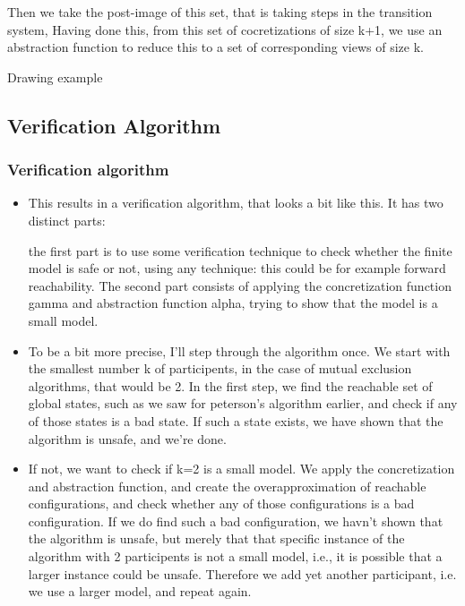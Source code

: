\documentclass[handout]{beamer}
\begin{document}
\begin{footnotesize}
\begin{frame}
\begin{itemize}
Then we take the post-image of this set, that is taking steps in the transition system,
Having done this, from this set of cocretizations of size k+1, we use an abstraction function to reduce this to a set of corresponding views of size k.

\end{itemize}
\end{frame}

\begin{frame}
Drawing example
\end{frame}

\subsection{Verification Algorithm}
\begin{frame}
  \frametitle{Verification algorithm} %
\begin{itemize}
\item
This results in a verification algorithm, that looks a bit like this. It has two distinct parts:

the first part is to use some verification technique to check whether the finite model is safe or not, using any technique: this could be for example forward reachability. The second part consists of applying the concretization function gamma and abstraction function alpha, trying to show that the model is a small model.
\item
To be a bit more precise, I'll step through the algorithm once. We start with the smallest number k of participents, in the case of mutual exclusion algorithms, that would be 2. In the first step, we find the reachable set of global states, such as we saw for peterson's algorithm earlier, and check if any of those states is a bad state. If such a state exists, we have shown that the algorithm is unsafe, and we're done.
\item
If not, we want to check if k=2 is a small model. We apply the concretization and abstraction function, and create the overapproximation of reachable configurations, and check whether any of those configurations is a bad configuration. If we do find such a bad configuration, we havn't shown that the algorithm is unsafe, but merely that that specific instance of the algorithm with 2 participents is not a small model, i.e., it is possible that a larger instance could be unsafe. Therefore we add yet another participant, i.e. we use a larger model, and repeat again.
\end{itemize}


\end{frame}
\end{footnotesize}
\end{document}
